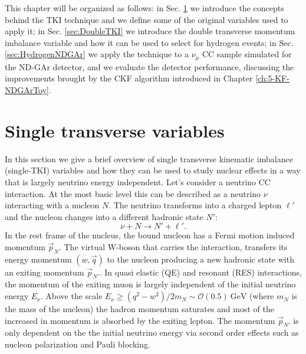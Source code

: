 This chapter will be organized as follows: in Sec. \ref{sec:SingleTKI} we introduce the concepts behind the TKI technique and we define some of the original variables used to apply it; in Sec. \ref{sec:DoubleTKI} we introduce the double transverse momentum imbalance variable and how it can be used to select for hydrogen events; in Sec. \ref{sec:HydrogenNDGAr} we apply the technique to a $\nu_\mu$ CC sample simulated for the ND-GAr detector, and we evaluate the detector performance, discussing the improvements brought by the CKF algorithm introduced in Chapter \ref{ch:5-KF-NDGArToy}.


\section{Single transverse variables}
\label{sec:SingleTKI}
In this section we give a brief overview of single transverse kinematic imbalance (single-TKI) variables and how they can be used to study nuclear effects in a way that is largely neutrino energy independent. Let's consider a neutrino CC interaction. At the most basic level this can be described as a neutrino $\nu$ interacting with a nucleon $N$. The neutrino transforms into a charged lepton $\ell'$ and the nucleon changes into a different hadronic state $N'$:
\begin{equation}
    \nu+N\rightarrow N'+\ell'.
\end{equation}
In the rest frame of the nucleus, the bound nucleon has a Fermi motion induced momentum $\Vec{p}_N$. The virtual W-boson that carries the interaction, transfers its energy momentum $(w,\Vec{q})$ to the nucleon producing a new hadronic state with an exiting momentum $\Vec{p}_{N'}$. In quasi elastic (QE) and resonant (RES) interactions, the momentum of the exiting muon is largely independent of the initial neutrino energy $E_\nu$. Above the scale $E_\nu\geq(q^2-w^2)/2m_N\sim\mathcal{O}(0.5)\  \text{GeV}$ (where $m_N$ is the mass of the nucleon) the hadron momentum saturates and most of the increased in momentum is absorbed by the exiting lepton. The momentum $\Vec{p}_{N'}$ is only dependent on the the initial neutrino energy via second order effects such as nucleon polarization and Pauli blocking. 

